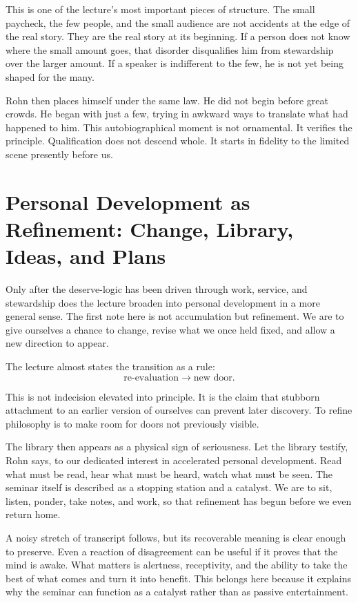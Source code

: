 This is one of the lecture's most important pieces of structure. The small paycheck, the few people, and the small audience are not accidents at the edge of the real story. They are the real story at its beginning. If a person does not know where the small amount goes, that disorder disqualifies him from stewardship over the larger amount. If a speaker is indifferent to the few, he is not yet being shaped for the many.

Rohn then places himself under the same law. He did not begin before great crowds. He began with just a few, trying in awkward ways to translate what had happened to him. This autobiographical moment is not ornamental. It verifies the principle. Qualification does not descend whole. It starts in fidelity to the limited scene presently before us.

\section{Personal Development as Refinement: Change, Library, Ideas, and Plans}

Only after the deserve-logic has been driven through work, service, and stewardship does the lecture broaden into personal development in a more general sense. The first note here is not accumulation but refinement. We are to give ourselves a chance to change, revise what we once held fixed, and allow a new direction to appear.

The lecture almost states the transition as a rule:
\begin{equation}
\text{re-evaluation} \rightarrow \text{new door}.
\end{equation}

This is not indecision elevated into principle. It is the claim that stubborn attachment to an earlier version of ourselves can prevent later discovery. To refine philosophy is to make room for doors not previously visible.

The library then appears as a physical sign of seriousness. Let the library testify, Rohn says, to our dedicated interest in accelerated personal development. Read what must be read, hear what must be heard, watch what must be seen. The seminar itself is described as a stopping station and a catalyst. We are to sit, listen, ponder, take notes, and work, so that refinement has begun before we even return home.

A noisy stretch of transcript follows, but its recoverable meaning is clear enough to preserve. Even a reaction of disagreement can be useful if it proves that the mind is awake. What matters is alertness, receptivity, and the ability to take the best of what comes and turn it into benefit. This belongs here because it explains why the seminar can function as a catalyst rather than as passive entertainment.

